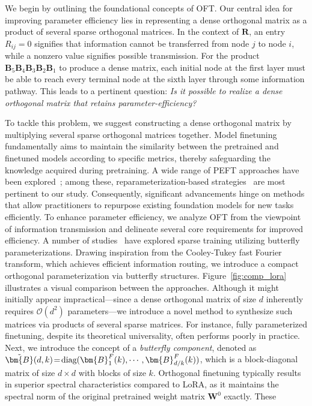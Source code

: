 \begin{itemize}[leftmargin=*,nosep]
We begin by outlining the foundational concepts of OFT. Our central idea for improving parameter efficiency lies in representing a dense orthogonal matrix as a product of several sparse orthogonal matrices. In the context of $\bm{R}$, an entry $R_{ij}=0$ signifies that information cannot be transferred from node $j$ to node $i$, while a nonzero value signifies possible transmission. For the product $\bm{B}_5\bm{B}_4\bm{B}_3\bm{B}_2\bm{B}_1$ to produce a dense matrix, each initial node at the first layer must be able to reach every terminal node at the sixth layer through some information pathway. This leads to a pertinent question: \emph{Is it possible to realize a dense orthogonal matrix that retains parameter-efficiency?}

To tackle this problem, we suggest constructing a dense orthogonal matrix by multiplying several sparse orthogonal matrices together. Model finetuning fundamentally aims to maintain the similarity between the pretrained and finetuned models according to specific metrics, thereby safeguarding the knowledge acquired during pretraining. A wide range of PEFT approaches have been explored~\cite{houlsby2019parameter,aghajanyan2020intrinsic,hulora2022,edalati2022krona,wang2022adamix,gheini2021cross,zaken2022bitfit,guo2020parameter,sung2021training,ansell2022composable,lester2021power,li2021prefix,vu2022spot,he2021towards,mao2021unipelt,karimi2021compacter,liu2022few,sung2022lst,chen2022parameter,jia2022visual,chen2022adaptformer,zhang2022neural,jie2023fact,lian2022scaling,luo2023towards}; among these, reparameterization-based strategies~\cite{aghajanyan2020intrinsic,hulora2022,edalati2022krona} are most pertinent to our study. Consequently, significant advancements hinge on methods that allow practitioners to repurpose existing foundation models for new tasks efficiently. To enhance parameter efficiency, we analyze OFT from the viewpoint of information transmission and delineate several core requirements for improved efficiency. A number of studies~\cite{dao2019learning,dao2019kaleidoscope,chen2022pixelated,dao2022monarch} have explored sparse training utilizing butterfly parameterizations. Drawing inspiration from the Cooley-Tukey fast Fourier transform, which achieves efficient information routing, we introduce a compact orthogonal parameterization via butterfly structures. Figure~\ref{fig:comp_lora} illustrates a visual comparison between the approaches. Although it might initially appear impractical—since a dense orthogonal matrix of size $d$ inherently requires $\mathcal{O}(d^2)$ parameters—we introduce a novel method to synthesize such matrices via products of several sparse matrices. For instance, fully parameterized finetuning, despite its theoretical universality, often performs poorly in practice.  Next, we introduce the concept of a \emph{butterfly component}, denoted as $\thickmuskip=2mu \medmuskip=2mu \tilde{\bm{B}}(d,k)=\text{diag}(\bm{B}^F_1(k),\cdots,\bm{B}^F_{d/k}(k))$, which is a block-diagonal matrix of size $d \times d$ with blocks of size $k$. Orthogonal finetuning typically results in superior spectral characteristics compared to LoRA, as it maintains the spectral norm of the original pretrained weight matrix $\bm{W}^0$ exactly. These 
\end{itemize}
